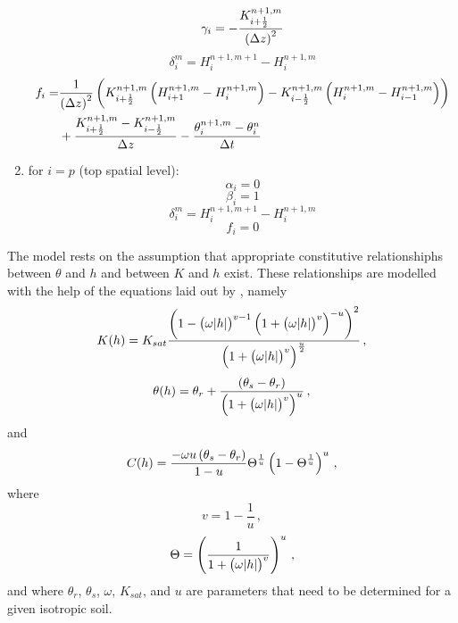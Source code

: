 \begin{enumerate}
  \begin{equation}
    \label{eq:gamma_intermediate}
    \gamma_i = - \frac{K_{i+\frac{1}{2}}^{n+1,m}}{\del{ \Delta z }^2}
  \end{equation}
  \begin{equation}
    \label{eq:delta_intermediate}
    \delta_i^m = H_i^{n+1,m+1} - H_i^{n+1,m}
  \end{equation}
  \begin{equation}
    \label{eq:f_intermediate}
    \begin{split}
      f_i = &\frac{1}{\del{ \Delta z }^2} \del{ K_{i+\frac{1}{2}}^{n+1,m} \del{ H_{i+1}^{n+1,m} - H_{i}^{n+1,m} } - K_{i-\frac{1}{2}}^{n+1,m} \del{ H_{i}^{n+1,m} - H_{i-1}^{n+1,m} } } \\
      &+ \frac{K_{i+\frac{1}{2}}^{n+1,m} - K_{i-\frac{1}{2}}^{n+1,m}}{\Delta z} - \frac{\theta_i^{n+1,m} - \theta_i^{n}}{\Delta t}
    \end{split}
  \end{equation}
\item for $i = p$ (top spatial level):
  \begin{equation}
    \label{eq:alpha_top}
    \alpha_i = 0
  \end{equation}
  \begin{equation}
    \label{eq:beta_top}
    \beta_i = 1
  \end{equation}
  \begin{equation}
    \label{eq:delta_top}
    \delta_i^m = H_i^{n+1,m+1} - H_i^{n+1,m}
  \end{equation}
  \begin{equation}
    \label{eq:f_top}
    f_i = 0
  \end{equation}
\end{enumerate}
The model rests on the assumption that appropriate constitutive relationshiphs between $\theta$ and $h$ and between $K$ and $h$ exist.  These relationships are modelled with the help of the equations laid out by \textcite{genuchten_closed-form_1980}, namely
\begin{equation}
  \label{eq:vange_K}
  K(h) = K_{sat} \frac{\del{ 1 - \del{ \omega \abs{h} }^{v-1} \del{ 1 + \del{ \omega \abs{h} }^v }^{-u} }^2}{\del{ 1 + \del{ \omega \abs{h} }^v }^{\frac{u}{2}}} \, ,
\end{equation}
\begin{equation}
  \label{eq:vange_theta}
  \theta(h) = \theta_r + \frac{\del{ \theta_s - \theta_r}}{\del{ 1 + \del{ \omega \abs{h} }^v }^u} \, ,
\end{equation}
and
\begin{equation}
  \label{eq:vange_C}
  C(h) = \frac{-\omega u \del{ \theta_s - \theta_r }}{1 - u} \Theta^{\frac{1}{u}} \del{ 1 - \Theta^{\frac{1}{u}} }^u \, ,
\end{equation}
where
\begin{equation*}
  v = 1 - \frac{1}{u} \, ,
\end{equation*}
\begin{equation*}
  \Theta = \del{ \frac{1}{1 + \del{ \omega \abs{h} }^v} }^u \, ,
\end{equation*}
and where $\theta_r$, $\theta_s$, $\omega$, $K_{sat}$, and $u$ are parameters that need to be determined for a given isotropic soil.

